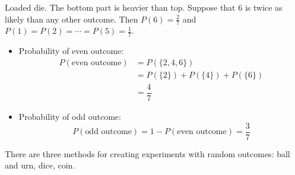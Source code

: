 \documentclass{report}
\begin{document}
\begin{examples}
    \begin{example}
        Loaded die. The bottom part is heavier than top. Suppose that $6$ is twice as likely than any other outcome. Then $P(6) = \frac{2}{7}$ and $P(1) = P(2) = \cdots = P(5) = \frac{1}{7}$.
            \begin{itemize}
                \item Probability of even outcome:
                    \begin{align*}
                        P(\text{even outcome}) &= P(\{2, 4, 6\})                 \\
                                               &= P(\{2\}) + P(\{4\}) + P(\{6\}) \\
                                               &= \dfrac{4}{7}                     
                    \end{align*}

                \item Probability of odd outcome:
                    \begin{equation*}
                        P(\text{odd outcome}) = 1 - P(\text{even outcome}) = \dfrac{3}{7}
                    \end{equation*}
            \end{itemize}
    \end{example}
\end{examples}

There are three methods for creating experiments with random outcomes: ball and urn, dice, coin.
\end{document}
